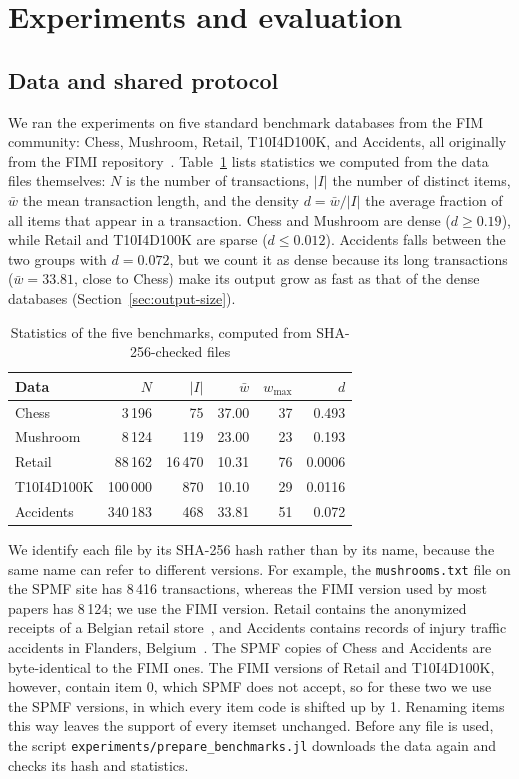 \section{Experiments and evaluation}
\label{sec:evaluation}
\subsection{Data and shared protocol}
\label{sec:protocol}
We ran the experiments on five standard benchmark databases from the FIM community:
Chess, Mushroom, Retail, T10I4D100K, and Accidents, all originally from the FIMI
repository~\cite{fimi}. Table~\ref{tab:datasets} lists statistics we computed from the
data files themselves: $N$ is the number of transactions, $|I|$ the number of distinct
items, $\bar{w}$ the mean transaction length, and the density $d = \bar{w} / |I|$ the
average fraction of all items that appear in a transaction. Chess and Mushroom are dense
($d \ge 0.19$), while Retail and T10I4D100K are sparse ($d \le 0.012$). Accidents falls
between the two groups with $d = 0.072$, but we count it as dense because its long
transactions ($\bar{w} = 33.81$, close to Chess) make its output grow as fast as that of
the dense databases (Section~\ref{sec:output-size}).

\begin{table}[t]
\centering
\caption{Statistics of the five benchmarks, computed from SHA-256-checked files}
\label{tab:datasets}
\begin{tabular}{lrrrrr}
\hline
Data & $N$ & $|I|$ & $\bar{w}$ & $w_{\max}$ & $d$ \\
\hline
Chess & 3\,196 & 75 & 37.00 & 37 & 0.493 \\
Mushroom & 8\,124 & 119 & 23.00 & 23 & 0.193 \\
Retail & 88\,162 & 16\,470 & 10.31 & 76 & 0.0006 \\
T10I4D100K & 100\,000 & 870 & 10.10 & 29 & 0.0116 \\
Accidents & 340\,183 & 468 & 33.81 & 51 & 0.072 \\
\hline
\end{tabular}
\end{table}

We identify each file by its SHA-256 hash rather than by its name, because the same name
can refer to different versions. For example, the \texttt{mushrooms.txt} file on the SPMF
site has 8\,416 transactions, whereas the FIMI version used by most papers has 8\,124; we use the FIMI version. Retail contains the anonymized receipts of a
Belgian retail store~\cite{brijs1999}, and Accidents contains records of injury traffic
accidents in Flanders, Belgium~\cite{geurts2003}. The SPMF copies of Chess and Accidents
are byte-identical to the FIMI ones. The FIMI versions of Retail and T10I4D100K, however,
contain item 0, which SPMF does not accept, so for these two we use the SPMF versions, in
which every item code is shifted up by 1. Renaming items this way leaves the support of
every itemset unchanged. Before any file is used, the script
\texttt{experiments/prepare\_benchmarks.jl} downloads the data again and checks its hash
and statistics.


